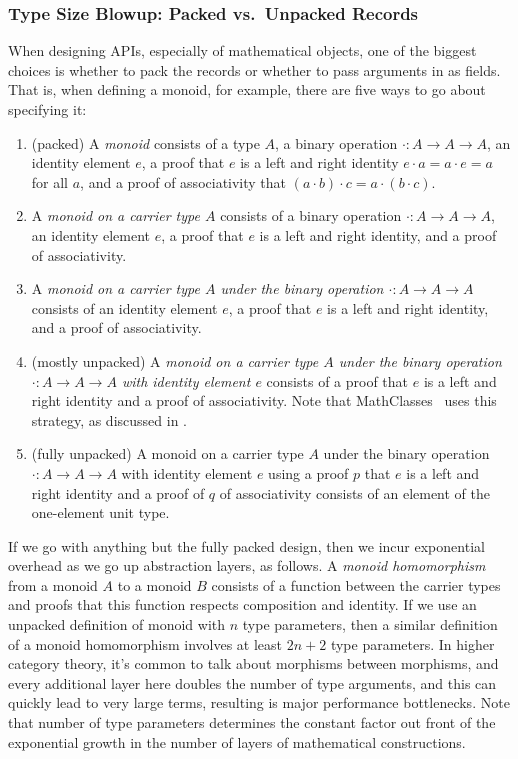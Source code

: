 \subsubsection{Type Size Blowup: Packed vs.\ Unpacked Records} \label{sec:abstraction-barriers:packed-records}
When designing APIs, especially of mathematical objects, one of the biggest choices is whether to pack the records or whether to pass arguments in as fields.
That is, when defining a monoid, for example, there are five ways to go about specifying it:
\begin{enumerate}
    \item
    (packed)
    A \emph{monoid} consists of a type $A$, a binary operation $\cdot : A \to A \to A$, an identity element $e$, a proof that $e$ is a left and right identity $e \cdot a = a \cdot e = a$ for all $a$, and a proof of associativity that $(a \cdot b) \cdot c = a \cdot (b \cdot c)$.
    \item
    A \emph{monoid on a carrier type $A$} consists of a binary operation $\cdot : A \to A \to A$, an identity element $e$, a proof that $e$ is a left and right identity, and a proof of associativity.
    \item
    A \emph{monoid on a carrier type $A$ under the binary operation $\cdot : A \to A \to A$} consists of an identity element $e$, a proof that $e$ is a left and right identity, and a proof of associativity.
    \item
    (mostly unpacked)
    A \emph{monoid on a carrier type $A$ under the binary operation $\cdot : A \to A \to A$ with identity element $e$} consists of a proof that $e$ is a left and right identity and a proof of associativity.
    Note that MathClasses~\cite{MathClasses,Type2011Spitters,spitters2010developing} uses this strategy, as discussed in \textcite{Packaging2009Garillot}.
    \item
    (fully unpacked) A monoid on a carrier type $A$ under the binary operation $\cdot : A \to A \to A$ with identity element $e$ using a proof $p$ that $e$ is a left and right identity and a proof of $q$ of associativity consists of an element of the one-element unit type.
\end{enumerate}
%

If we go with anything but the fully packed design, then we incur exponential overhead as we go up abstraction layers, as follows.
A \emph{monoid homomorphism} from a monoid $A$ to a monoid $B$ consists of a function between the carrier types and proofs that this function respects composition and identity.
If we use an unpacked definition of monoid with $n$ type parameters, then a similar definition of a monoid homomorphism involves at least $2n+2$ type parameters.
In higher category theory, it's common to talk about morphisms between morphisms, and every additional layer here doubles the number of type arguments, and this can quickly lead to very large terms, resulting is major performance bottlenecks.
Note that number of type parameters determines the constant factor out front of the exponential growth in the number of layers of mathematical constructions.

